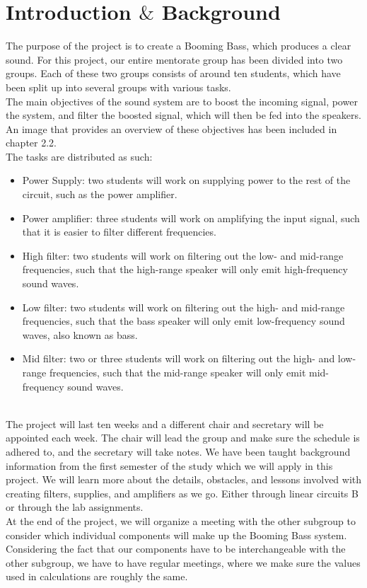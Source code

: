 \chapter{Introduction $\&$ Background } 
The purpose of the project is to create a Booming Bass, which produces a clear sound. For this project, our entire mentorate group has been divided into two groups. Each of these two groups consists of around ten students, which have been split up into several groups with various tasks. \\
The main objectives of the sound system are to boost the incoming signal, power the system, and filter the boosted signal, which will then be fed into the speakers. An image that provides an overview of these objectives has been included in chapter 2.2. \\

The tasks are distributed as such:
\begin{itemize}
    \item Power Supply: two students will work on supplying power to the rest of the circuit, such as the power amplifier.
    \item Power amplifier: three students will work on amplifying the input signal, such that it is easier to filter different frequencies. 
    \item High filter: two students will work on filtering out the low- and mid-range frequencies, such that the high-range speaker will only emit high-frequency sound waves.
    \item Low filter: two students will work on filtering out the high- and mid-range frequencies, such that the bass speaker will only emit low-frequency sound waves, also known as bass.
    \item Mid filter: two or three students will work on filtering out the high- and low-range frequencies, such that the mid-range speaker will only emit mid-frequency sound waves.
\end{itemize}
\\
The project will last ten weeks and a different chair and secretary will be appointed each week. The chair will lead the group and make sure the schedule is adhered to, and the secretary will take notes. We have been taught background information from the first semester of the study which we will apply in this project. We will learn more about the details, obstacles, and lessons involved with creating filters, supplies, and amplifiers as we go. Either through linear circuits B or through the lab assignments.
\\ \newline
At the end of the project, we will organize a meeting with the other subgroup to consider which individual components will make up the Booming Bass system. Considering the fact that our components have to be interchangeable with the other subgroup, we have to have regular meetings, where we make sure the values used in calculations are roughly the same.\\

